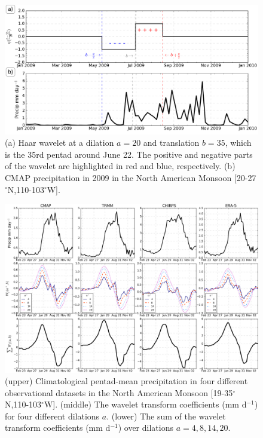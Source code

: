   \begin{figure}[t!]
\centering
 \includegraphics[width=\linewidth]{figures/wav1.png}
\caption[Haar wavelet exmaple]{ (a) Haar wavelet at a dilation $a=20$ and translation $b=35$, which is the 35rd pentad around June 22. The positive and negative parts of the wavelet are highlighted in red and blue, respectively. (b) CMAP precipitation in 2009 in the North American Monsoon [20-27$^\circ$N,110-103$^\circ$W]. }
\label{fig:wvt_f1}
\end{figure}


\begin{figure}[t!]
\centering
 \includegraphics[width=\linewidth]{figures/wav_paperfig2.png}
\caption[Wavelet transform coefficient in North American Monsoon]{ (upper) Climatological pentad-mean precipitation in four different observational datasets in the North American Monsoon [19-35$^\circ$N,110-103$^\circ$W]. (middle) The wavelet transform coefficients (mm d$^{-1}$) for four different dilations $a$. (lower) The sum of the wavelet transform coefficients (mm d$^{-1}$) over dilations $a={4,8,14,20}$. }
\label{fig:wvt_f2}
\end{figure}

